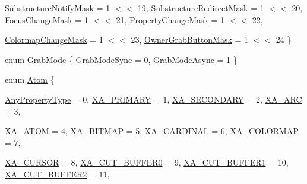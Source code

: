 \begin{DoxyCompactItemize}
\par
\hyperlink{namespace_tao_1_1_platform_1_1_x11_ae1837b5af1f45a8d6387b66b941e64b1}{SubstructureNotifyMask} =  1 $<$$<$ 19, 
\hyperlink{namespace_tao_1_1_platform_1_1_x11_ae1837b5af1f45a8d6387b66b941e64b1}{SubstructureRedirectMask} =  1 $<$$<$ 20, 
\hyperlink{namespace_tao_1_1_platform_1_1_x11_ae1837b5af1f45a8d6387b66b941e64b1}{FocusChangeMask} =  1 $<$$<$ 21, 
\hyperlink{namespace_tao_1_1_platform_1_1_x11_ae1837b5af1f45a8d6387b66b941e64b1}{PropertyChangeMask} =  1 $<$$<$ 22, 
\par
\hyperlink{namespace_tao_1_1_platform_1_1_x11_ae1837b5af1f45a8d6387b66b941e64b1}{ColormapChangeMask} =  1 $<$$<$ 23, 
\hyperlink{namespace_tao_1_1_platform_1_1_x11_ae1837b5af1f45a8d6387b66b941e64b1}{OwnerGrabButtonMask} =  1 $<$$<$ 24
 \}
\item 
enum \hyperlink{namespace_tao_1_1_platform_1_1_x11_ac8eaa5aed442366f5fb209a4fe218eb5}{GrabMode} \{ \hyperlink{namespace_tao_1_1_platform_1_1_x11_ac8eaa5aed442366f5fb209a4fe218eb5}{GrabModeSync} =  0, 
\hyperlink{namespace_tao_1_1_platform_1_1_x11_ac8eaa5aed442366f5fb209a4fe218eb5}{GrabModeAsync} =  1
 \}
\item 
enum \hyperlink{namespace_tao_1_1_platform_1_1_x11_a9042a68c2a3fd29002b5ad9d26f5776a}{Atom} \{ \par
\hyperlink{namespace_tao_1_1_platform_1_1_x11_a9042a68c2a3fd29002b5ad9d26f5776a}{AnyPropertyType} =  0, 
\hyperlink{namespace_tao_1_1_platform_1_1_x11_a9042a68c2a3fd29002b5ad9d26f5776a}{XA\_\-PRIMARY} =  1, 
\hyperlink{namespace_tao_1_1_platform_1_1_x11_a9042a68c2a3fd29002b5ad9d26f5776a}{XA\_\-SECONDARY} =  2, 
\hyperlink{namespace_tao_1_1_platform_1_1_x11_a9042a68c2a3fd29002b5ad9d26f5776a}{XA\_\-ARC} =  3, 
\par
\hyperlink{namespace_tao_1_1_platform_1_1_x11_a9042a68c2a3fd29002b5ad9d26f5776a}{XA\_\-ATOM} =  4, 
\hyperlink{namespace_tao_1_1_platform_1_1_x11_a9042a68c2a3fd29002b5ad9d26f5776a}{XA\_\-BITMAP} =  5, 
\hyperlink{namespace_tao_1_1_platform_1_1_x11_a9042a68c2a3fd29002b5ad9d26f5776a}{XA\_\-CARDINAL} =  6, 
\hyperlink{namespace_tao_1_1_platform_1_1_x11_a9042a68c2a3fd29002b5ad9d26f5776a}{XA\_\-COLORMAP} =  7, 
\par
\hyperlink{namespace_tao_1_1_platform_1_1_x11_a9042a68c2a3fd29002b5ad9d26f5776a}{XA\_\-CURSOR} =  8, 
\hyperlink{namespace_tao_1_1_platform_1_1_x11_a9042a68c2a3fd29002b5ad9d26f5776a}{XA\_\-CUT\_\-BUFFER0} =  9, 
\hyperlink{namespace_tao_1_1_platform_1_1_x11_a9042a68c2a3fd29002b5ad9d26f5776a}{XA\_\-CUT\_\-BUFFER1} =  10, 
\hyperlink{namespace_tao_1_1_platform_1_1_x11_a9042a68c2a3fd29002b5ad9d26f5776a}{XA\_\-CUT\_\-BUFFER2} =  11, 

\end{DoxyCompactItemize}
